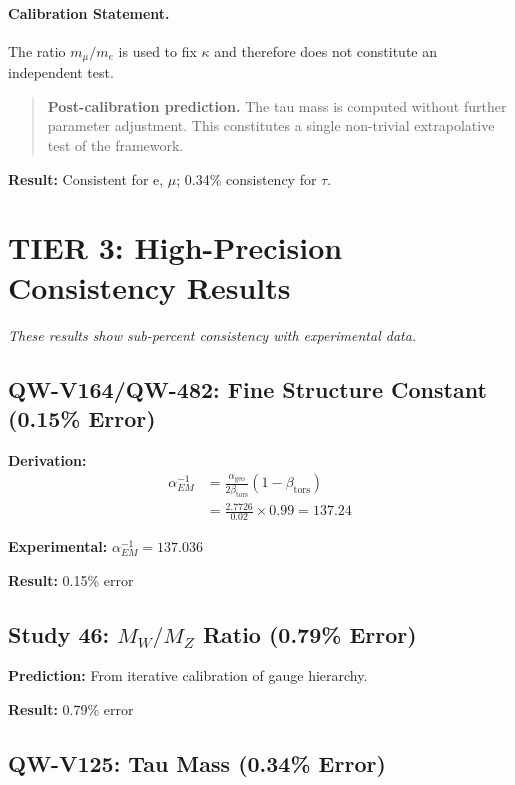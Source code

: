 \documentclass[11pt,a4paper]{book}
\theoremstyle{remark}
\newcommand{\alphageo}{\alpha_{\text{geo}}}
\newcommand{\betators}{\beta_{\text{tors}}}
\begin{document}
\paragraph{Calibration Statement.}
The ratio $m_\mu/m_e$ is used to fix $\kappa$ and therefore does not constitute an independent test.

\begin{quote}
\textbf{Post-calibration prediction.}
The tau mass is computed without further parameter adjustment.
This constitutes a single non-trivial extrapolative test of the framework.
\end{quote}

\textbf{Result:} Consistent for e, $\mu$; 0.34\% consistency for $\tau$.

\section{TIER 3: High-Precision Consistency Results}

\textit{These results show sub-percent consistency with experimental data.}

\subsection{QW-V164/QW-482: Fine Structure Constant (0.15\% Error)}

\textbf{Derivation:}
\begin{align}
\alpha_{EM}^{-1} &= \frac{\alphageo}{2\betators}(1 - \betators) \\
&= \frac{2.7726}{0.02} \times 0.99 = \boxed{137.24}
\end{align}

\textbf{Experimental:} $\alpha_{EM}^{-1} = 137.036$

\textbf{Result:} 0.15\% error

\subsection{Study 46: $M_W/M_Z$ Ratio (0.79\% Error)}

\textbf{Prediction:} From iterative calibration of gauge hierarchy.

\textbf{Result:} 0.79\% error

\subsection{QW-V125: Tau Mass (0.34\% Error)}
\end{document}
